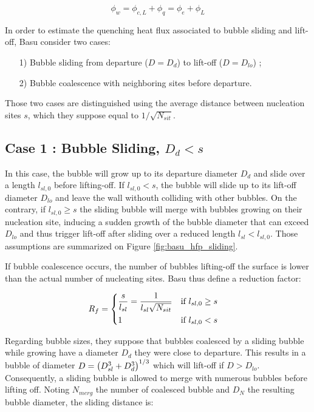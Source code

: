 \begin{equation}
\phi_{w} = \phi_{c,L}+\phi_{q} = \phi_{e} + \phi_{L}
\label{eq:basu_hfp_phitot}
\end{equation}

In order to estimate the quenching heat flux associated to bubble sliding and lift-off, Basu \etal consider two cases: 

\begin{itemize}
\item[1)] Bubble sliding from departure ($D=D_{d}$) to lift-off ($D=D_{lo}$) ;
\item[2)] Bubble coalescence with neighboring sites before departure.
\end{itemize} 

Those two cases are distinguished using the average distance between nucleation sites $s$, which they suppose equal to $1/\sqrt{N_{sit}}$.

\subsection{Case 1 : Bubble Sliding, $D_{d}<s$}

In this case, the bubble will grow up to its departure diameter $D_{d}$ and slide over a length $l_{sl,0}$ before lifting-off. If $l_{sl,0}<s$, the bubble will slide up to its lift-off diameter $D_{lo}$ and leave the wall withouth colliding with other bubbles. On the contrary, if $l_{sl,0}\geq s$ the sliding bubble will merge with bubbles growing on their nucleation site, inducing a sudden growth of the bubble diameter that can exceed $D_{lo}$ and thus trigger lift-off after sliding over a reduced length $l_{sl}<l_{sl,0}$. Those assumptions are summarized on Figure \ref{fig:basu_hfp_sliding}.

If bubble coalescence occurs, the number of bubbles lifting-off the surface is lower than the actual number of nucleating sites. Basu \etal thus define a reduction factor:

\begin{align}
R_{f}&=
\begin{dcases}
\dfrac{s}{l_{sl}} = \dfrac{1}{l_{sl}\sqrt{N_{sit}}} & \text{if } l_{sl,0} \geq s \\
1 & \text{if } l_{sl,0}<s
\end{dcases}
\label{eq:basu_hfp_Rf}
\end{align}  


Regarding bubble sizes, they suppose that bubbles coalesced by a sliding bubble while growing have a diameter $D_{d}$ \ie they were close to departure. %
This results in a bubble of diameter $D=\left( D_{sl}^{3} + D_{d}^{3} \right)^{1/3}$ which will lift-off if $D>D_{lo}$. Consequently, a sliding bubble is allowed to merge with numerous bubbles before lifting off. Noting $N_{merg}$ the number of coalesced bubble and $D_{N}$ the resulting bubble diameter, the sliding distance is:

